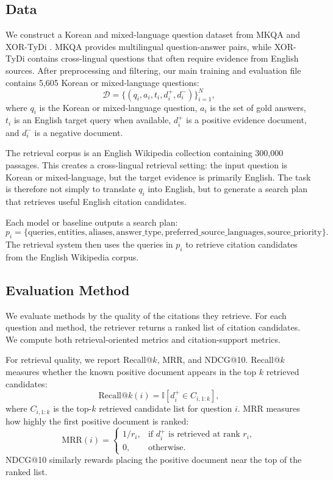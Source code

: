 \documentclass{article}
\begin{document}
\subsection{Data}
\label{sec:data}

We construct a Korean and mixed-language question dataset from MKQA \cite{longpre2020mkqa} and XOR-TyDi \cite{asai2020xor}. MKQA provides multilingual question-answer pairs, while XOR-TyDi contains cross-lingual questions that often require evidence from English sources. After preprocessing and filtering, our main training and evaluation file contains 5,605 Korean or mixed-language questions:
\[
\mathcal{D} = \{(q_i, a_i, t_i, d_i^+, d_i^-)\}_{i=1}^{N},
\]
where $q_i$ is the Korean or mixed-language question, $a_i$ is the set of gold answers, $t_i$ is an English target query when available, $d_i^+$ is a positive evidence document, and $d_i^-$ is a negative document.

The retrieval corpus is an English Wikipedia collection containing 300,000 passages. This creates a cross-lingual retrieval setting: the input question is Korean or mixed-language, but the target evidence is primarily English. The task is therefore not simply to translate $q_i$ into English, but to generate a search plan that retrieves useful English citation candidates.

Each model or baseline outputs a search plan:
\[
p_i = \{\text{queries}, \text{entities}, \text{aliases}, \text{answer\_type},
\text{preferred\_source\_languages}, \text{source\_priority}\}.
\]
The retrieval system then uses the queries in $p_i$ to retrieve citation candidates from the English Wikipedia corpus.

\subsection{Evaluation Method}
\label{sec:evaluation_method}

We evaluate methods by the quality of the citations they retrieve. For each question and method, the retriever returns a ranked list of citation candidates. We compute both retrieval-oriented metrics and citation-support metrics.

For retrieval quality, we report Recall@$k$, MRR, and NDCG@10. Recall@$k$ measures whether the known positive document appears in the top $k$ retrieved candidates:
\[
\mathrm{Recall@}k(i) =
\mathbb{I}\!\left[d_i^+ \in C_{i,1:k}\right],
\]
where $C_{i,1:k}$ is the top-$k$ retrieved candidate list for question $i$. MRR measures how highly the first positive document is ranked:
\[
\mathrm{MRR}(i) =
\begin{cases}
1 / r_i, & \text{if } d_i^+ \text{ is retrieved at rank } r_i,\\
0, & \text{otherwise.}
\end{cases}
\]
NDCG@10 similarly rewards placing the positive document near the top of the ranked list.
\end{document}
